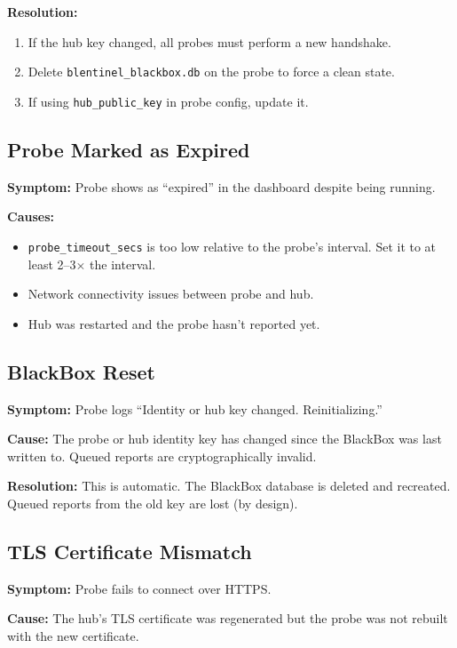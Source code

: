 \documentclass[12pt]{report}
\begin{document}
\textbf{Resolution:}
\begin{enumerate}
    \item If the hub key changed, all probes must perform a new handshake.
    \item Delete \texttt{blentinel\_blackbox.db} on the probe to force a clean
          state.
    \item If using \texttt{hub\_public\_key} in probe config, update it.
\end{enumerate}

\subsection{Probe Marked as Expired}

\textbf{Symptom:} Probe shows as ``expired'' in the dashboard despite being
running.

\textbf{Causes:}
\begin{itemize}
    \item \texttt{probe\_timeout\_secs} is too low relative to the probe's
          interval. Set it to at least 2--3$\times$ the interval.
    \item Network connectivity issues between probe and hub.
    \item Hub was restarted and the probe hasn't reported yet.
\end{itemize}

\subsection{BlackBox Reset}

\textbf{Symptom:} Probe logs ``Identity or hub key changed. Reinitializing.''

\textbf{Cause:} The probe or hub identity key has changed since the BlackBox
was last written to. Queued reports are cryptographically invalid.

\textbf{Resolution:} This is automatic. The BlackBox database is deleted and
recreated. Queued reports from the old key are lost (by design).

\subsection{TLS Certificate Mismatch}

\textbf{Symptom:} Probe fails to connect over HTTPS.

\textbf{Cause:} The hub's TLS certificate was regenerated but the probe was
not rebuilt with the new certificate.
\end{document}
